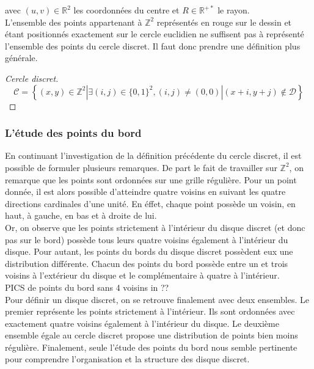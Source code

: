 avec $(u,v) \in \mathbb{R}^{2}$ les coordonnées du centre et $R \in \mathbb{R}^{+*}$ le rayon.\\


L'ensemble des points appartenant à $\mathbb{Z}^{2}$ représentés en rouge sur le dessin et étant positionnés exactement sur le cercle euclidien ne suffisent pas à représenté l'ensemble des points du cercle discret. Il faut donc prendre une définition plus générale.

\begin{proof}[Cercle discret]
  $$ \mathcal{C} =  \left\{ (x,y) \in \mathbb{Z}^{2} | \exists (i,j) \in \{0,1\}^2, (i,j) \ne (0,0) | (x+i,y+j) \notin \mathcal{D} \right\}$$
\end{proof}


\subsubsection{L'étude des points du bord}

En continuant l'investigation de la définition précédente du cercle discret, il est possible de formuler plusieurs remarques. De part le fait de travailler sur $\mathbb{Z}^{2}$, on remarque que les points sont ordonnées sur une grille régulière. Pour un point donnée, il est alors possible d'atteindre quatre voisins en suivant les quatre directions cardinales d'une unité. En éffet, chaque point possède un voisin, en haut, à gauche, en bas et à droite de lui. \\


Or, on observe que les points strictement à l'intérieur du disque discret (et donc pas sur le bord) possède tous leurs quatre voisins également à l'intérieur du disque. Pour autant, les points du bords du disque discret possèdent eux une distribution différente. Chacun des points du bord possède entre un et trois voisins à l'extérieur du disque et le complémentaire à quatre à l'intérieur.\\

PICS de points du bord sans 4 voisins in ??\\

Pour définir un disque discret, on se retrouve finalement avec deux ensembles. Le premier représente les points strictement à l'intérieur. Ils sont ordonnées avec exactement quatre voisins également à l'intérieur du disque. Le deuxième ensemble égale au cercle discret propose une distribution de points bien moins régulière. Finalement, seule l'étude des points du bord nous semble pertinente pour comprendre l'organisation et la structure des disque discret.


